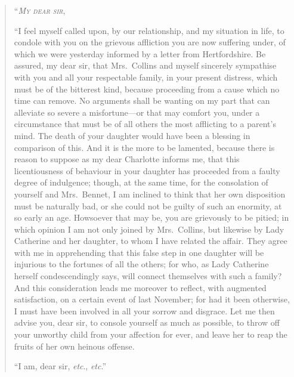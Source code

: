 \documentclass[12pt,english,oneside]{book}
\newcommand{\noun}[1]{\textsc{#1}}
\begin{document}
\noindent \begin{quotation}\noindent{}{}``\textit{\emph{\noun{My}}}
\textit{\emph{\noun{dear}}} \textit{\emph{\noun{sir}}},

{}``I feel myself called upon, by our relationship, and my situation
in life, to condole with you on the grievous affliction you are now
suffering under, of which we were yesterday informed by a letter from
Hertfordshire. Be assured, my dear sir, that Mrs.\ Collins and myself
sincerely sympathise with you and all your respectable family, in
your present distress, which must be of the bitterest kind, because
proceeding from a cause which no time can remove. No arguments shall
be wanting on my part that can alleviate so severe a misfortune\mbox{---}or
that may comfort you, under a circumstance that must be of all others
the most afflicting to a parent's mind. The death of your daughter
would have been a blessing in comparison of this. And it is the more
to be lamented, because there is reason to suppose as my dear Charlotte
informs me, that this licentiousness of behaviour in your daughter
has proceeded from a faulty degree of indulgence; though, at the same
time, for the consolation of yourself and Mrs.\ Bennet, I am inclined
to think that her own disposition must be naturally bad, or she could
not be guilty of such an enormity, at so early an age. Howsoever that
may be, you are grievously to be pitied; in which opinion I am not
only joined by Mrs.\ Collins, but likewise by Lady Catherine and
her daughter, to whom I have related the affair. They agree with me
in apprehending that this false step in one daughter will be injurious
to the fortunes of all the others; for who, as Lady Catherine herself
condescendingly says, will connect themselves with such a family?
And this consideration leads me moreover to reflect, with augmented
satisfaction, on a certain event of last November; for had it been
otherwise, I must have been involved in all your sorrow and disgrace.
Let me then advise you, dear sir, to console yourself as much as possible,
to throw off your unworthy child from your affection for ever, and
leave her to reap the fruits of her own heinous offense.

``I am, dear sir, \textit{etc}., \textit{etc}.''
\end{quotation}
\end{document}
